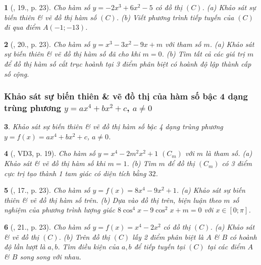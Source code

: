 \documentclass{article}
\newtheorem{baitoan}{}
\begin{document}
\begin{baitoan}[\cite{TLCT_giai_tich_12}, 19., p. 23]
	Cho hàm số $y = -2x^3 + 6x^2 - 5$ có đồ thị $(C)$. (a) Khảo sát sự biến thiên \& vẽ đồ thị hàm số $(C)$. (b) Viết phương trình tiếp tuyến của $(C)$ đi qua điểm $A(-1;-13)$.	
\end{baitoan}

\begin{baitoan}[\cite{TLCT_giai_tich_12}, 20., p. 23]
	Cho hàm số $y = x^3 - 3x^2 - 9x + m$ với tham số $m$. (a) Khảo sát sự biến thiên \& vẽ đồ thị hàm số đã cho khi $m = 0$. (b) Tìm tất cả các giá trị $m$ để đồ thị hàm số cắt trục hoành tại 3 điểm phân biệt có hoành độ lập thành cấp số cộng.	
\end{baitoan}

\subsubsection{Khảo sát sự biến thiên \& vẽ đồ thị của hàm số bậc 4 dạng trùng phương $y = ax^4 + bx^2 + c$, $a\ne 0$}

\begin{baitoan}
	Khảo sát sự biến thiên \& vẽ đồ thị hàm số bậc 4 dạng trùng phương $y = f(x) = ax^4 + bx^2 + c$, $a\ne 0$.
\end{baitoan}

\begin{baitoan}[\cite{TLCT_giai_tich_12}, VD3, p. 19]
	Cho hàm số $y = x^4 - 2m^2x^2 + 1$ $(C_m)$ với $m$ là tham số. (a) Khảo sát \& vẽ đồ thị hàm số khi $m = 1$. (b) Tìm $m$ để đồ thị $(C_m)$ có 3 điểm cực trị tạo thành 1 tam giác có diện tích bằng $32$.	
\end{baitoan}

\begin{baitoan}[\cite{TLCT_giai_tich_12}, 17., p. 23]
	Cho hàm số $y = f(x) = 8x^4 - 9x^2 + 1$. (a) Khảo sát sự biến thiên \& vẽ đồ thị hàm số trên. (b) Dựa vào đồ thị trên, biện luận theo $m$ số nghiệm của phương trình lượng giác $8\cos^4x - 9\cos^2x + m = 0$ với $x\in[0;\pi]$.
\end{baitoan}

\begin{baitoan}[\cite{TLCT_giai_tich_12}, 21., p. 23]
	Cho hàm số $y = f(x) = x^4 - 2x^2$ có đồ thị $(C)$. (a) Khảo sát \& vẽ đồ thị $(C)$. (b) Trên đồ thị $(C)$ lấy 2 điểm phân biệt là $A$ \& $B$ có hoành độ lần lượt là $a,b$. Tìm điều kiện của $a,b$ để tiếp tuyến tại $(C)$ tại các điểm $A$ \& $B$ song song với nhau.
\end{baitoan}
\end{document}
